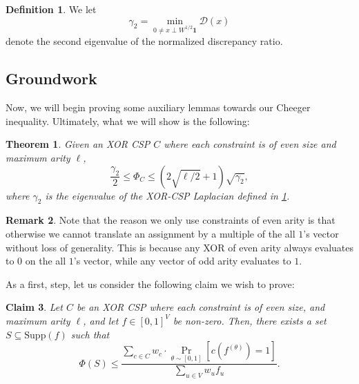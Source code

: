\documentclass[11pt]{article}
\newtheorem{theorem}{Theorem}[section]
\newtheorem{claim}[theorem]{Claim}
\theoremstyle{definition}
\newtheorem{definition}{Definition}[section]
\newtheorem{remark}[theorem]{Remark}
\newcommand{\Supp}{\mathrm{Supp}}
\begin{document}
\begin{definition}\label{def:eigenvalue}
    We let 
    \[
    \gamma_2 = \min_{0 \neq x \perp W^{1/2} \mathbf{1}} \mathcal{D}(x)
    \]
    denote the second eigenvalue of the normalized discrepancy ratio. 
\end{definition}

\subsection{Groundwork}

Now, we will begin proving some auxiliary lemmas towards our Cheeger inequality. Ultimately, what we will show is the following:

\begin{theorem}
    Given an XOR CSP $C$ where each constraint is of even size and maximum arity $\ell$,
    \[
    \frac{\gamma_2}{2} \leq \Phi_C \leq \left (2 \sqrt{\ell/2} + 1 \right) \sqrt{\gamma_2},
    \]
    where $\gamma_2$ is the eigenvalue of the XOR-CSP Laplacian defined in \cref{def:eigenvalue}. 
\end{theorem}

\begin{remark}
    Note that the reason we only use constraints of even arity is that otherwise we cannot translate an assignment by a multiple of the all $1$'s vector without loss of generality. This is because any XOR of even arity always evaluates to $0$ on the all $1$'s vector, while any vector of odd arity evaluates to $1$.
\end{remark}

As a first, step, let us consider the following claim we wish to prove: 

\begin{claim}\label{clm:rounding}
    Let $C$ be an XOR CSP where each constraint is of even size, and maximum arity $\ell$, and let $f \in [0,1]^V$ be non-zero. Then, there exists a set $S \subseteq \Supp(f)$ such that 
    \[
    \Phi(S) \leq \frac{\sum_{c \in C} w_c \cdot \Pr_{\theta \sim [0,1]}[c(f^{(\theta)}) = 1]}{\sum_{u \in V} w_u f_u}.
    \]
\end{claim}
\end{document}
